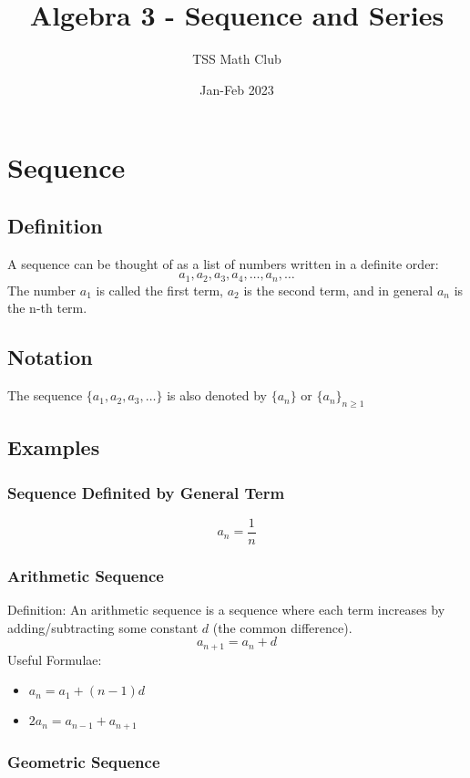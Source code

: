 \documentclass{article}
\title{Algebra 3 - Sequence and Series}
\author{TSS Math Club}
\date{Jan-Feb 2023}
\begin{document}
\large

\maketitle

\section{Sequence}

\subsection{Definition}
A sequence can be thought of as a list of numbers written in a definite order:
$$a_1, a_2, a_3, a_4,\dots , a_n, \dots$$
The number $a_1$ is called the first term, $a_2$ is the second term, and in general $a_n$ is the n-th
term.

\subsection{Notation}
The sequence $\{a_1, a_2, a_3, \dots\}$ is also denoted by $\{a_n\}$ or $\{a_n\}_{n \ge 1}$


\subsection{Examples}

\subsubsection{Sequence Definited by General Term}
$$a_n = \frac{1}{n}$$



\subsubsection{Arithmetic Sequence}
Definition:
An arithmetic sequence is a sequence where each term increases by adding/subtracting some constant $d$ (the common difference).
$$a_{n+1}=a_{n}+d$$
Useful Formulae:
\begin{itemize}
    \item $a_{n}=a_1+(n-1)d$
    \item $2a_{n}=a_{n-1}+a_{n+1}$
\end{itemize}
\subsubsection{Geometric Sequence}
\end{document}
